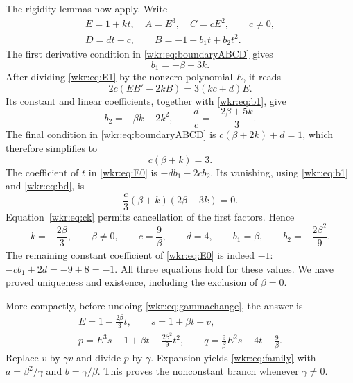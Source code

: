 \documentclass[11pt,a4paper]{article}
\numberwithin{equation}{section}
\theoremstyle{definition}
\theoremstyle{remark}
\begin{document}
The rigidity lemmas now apply. Write
\begin{equation}\label{wkr:eq:linearforms}
\begin{gathered}
E=1+kt,\quad A=E^3,\quad C=cE^2,\qquad c\ne0,\\
D=dt-c,\qquad B=-1+b_1t+b_2t^2.
\end{gathered}
\end{equation}
The first derivative condition in \eqref{wkr:eq:boundaryABCD} gives
\begin{equation}\label{wkr:eq:b1}
b_1=-\beta-3k.
\end{equation}
After dividing \eqref{wkr:eq:E1} by the nonzero polynomial $E$, it reads
\begin{equation}\label{wkr:eq:keylinear}
2c(EB'-2kB)=3(kc+d)E.
\end{equation}
Its constant and linear coefficients, together with \eqref{wkr:eq:b1}, give
\begin{equation}\label{wkr:eq:bd}
b_2=-\beta k-2k^2,\qquad
\frac dc=-\frac{2\beta+5k}{3}.
\end{equation}
The final condition in \eqref{wkr:eq:boundaryABCD} is
$c(\beta+2k)+d=1$, which therefore simplifies to
\begin{equation}\label{wkr:eq:ck}
c(\beta+k)=3.
\end{equation}
The coefficient of $t$ in \eqref{wkr:eq:E0} is $-db_1-2cb_2$. Its vanishing,
using \eqref{wkr:eq:b1} and \eqref{wkr:eq:bd}, is
\[
\frac c3(\beta+k)(2\beta+3k)=0.
\]
Equation~\eqref{wkr:eq:ck} permits cancellation of the first factors. Hence
\begin{equation}\label{wkr:eq:endpoint}
k=-\frac{2\beta}{3},\qquad
\beta\ne0,\qquad c=\frac9\beta,\qquad d=4,
\qquad b_1=\beta,\qquad b_2=-\frac{2\beta^2}{9}.
\end{equation}
The remaining constant coefficient of \eqref{wkr:eq:E0} is indeed $-1$:
$-cb_1+2d=-9+8=-1$. All three equations hold for these values. We have proved
uniqueness and existence, including the exclusion of $\beta=0$.

More compactly, before undoing \eqref{wkr:eq:gammachange}, the answer is
\begin{equation}\label{wkr:eq:compactendpoint}
\begin{gathered}
E=1-\frac{2\beta}{3}t,\qquad s=1+\beta t+v,\\
p=E^3s-1+\beta t-\frac{2\beta^2}{9}t^2,\qquad
q=\frac9\beta E^2s+4t-\frac9\beta.
\end{gathered}
\end{equation}
Replace $v$ by $\gamma v$ and divide $p$ by $\gamma$. Expansion yields
\eqref{wkr:eq:family} with $a=\beta^2/\gamma$ and $b=\gamma/\beta$.
This proves the nonconstant branch whenever $\gamma\ne0$.
\end{document}
